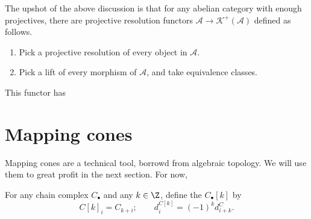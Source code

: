 \documentclass[main.tex]{subfiles}
\begin{document}

The upshot of the above discussion is that for any abelian category with enough projectives, there are projective resolution functors $\mathcal{A} \to \mathcal{K}^{+}(\mathcal{A})$ defined as follows.
\begin{enumerate}
  \item Pick a projective resolution of every object in $\mathcal{A}$.

  \item Pick a lift of every morphism of $\mathcal{A}$, and take equivalence classes.
\end{enumerate}

This functor has

\section{Mapping cones}
\label{sec:mapping_cones}

Mapping cones are a technical tool, borrowd from algebraic topology. We will use them to great profit in the next section. For now, 


\begin{definition}
  \label{def:shift_functor}
  For any chain complex $C_{\bullet}$ and any $k \in \Z$, define the  $C_{\bullet}[k]$ by
  \begin{equation*}
    C[k]_{i} = C_{k+i};\qquad d^{C[k]}_{i} = (-1)^{k}d^{C}_{i+k}.
  \end{equation*}
\end{definition}
\end{document}
